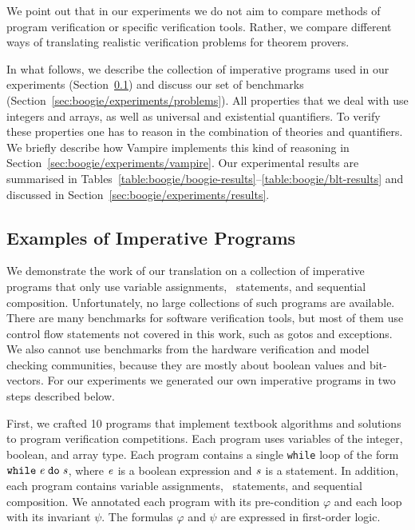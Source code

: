 We point out that in our experiments we do not aim to compare methods of program verification or specific verification tools. Rather, we compare different ways of translating realistic verification problems for theorem provers.

In what follows, we describe the collection of imperative programs used in our experiments (Section~\ref{sec:boogie/experiments/programs}) and discuss our set of benchmarks (Section~\ref{sec:boogie/experiments/problems}). All properties that we deal with use integers and arrays, as well as universal and existential quantifiers. To verify these properties one has to reason in the combination of theories and quantifiers. We briefly describe how Vampire implements this kind of reasoning in Section~\ref{sec:boogie/experiments/vampire}. Our experimental results are summarised in Tables~\ref{table:boogie/boogie-results}--\ref{table:boogie/blt-results} and discussed in Section~\ref{sec:boogie/experiments/results}.

\newcommand{\bad}{\mathit{bad}}
\newcommand{\iter}{i}

\subsection{Examples of Imperative Programs}\label{sec:boogie/experiments/programs}
We demonstrate the work of our translation on a collection of imperative programs that only use variable assignments, \ITE\ statements, and sequential composition. Unfortunately, no large collections of such programs are available. There are many benchmarks for software verification tools, but most of them use control flow statements not covered in this work, such as gotos and exceptions. We also cannot use benchmarks from the hardware verification and model checking communities, because they are mostly about boolean values and bit-vectors. For our experiments we generated our own imperative programs in two steps described below.

First, we crafted 10 programs that implement textbook algorithms and solutions to program verification competitions. Each program uses variables of the integer, boolean, and array type. Each program contains a single \verb'while' loop
of the form $\mathtt{while}\;{\mathit{e}}\;\mathtt{do}\;{\mathit{s}}$, where $\mathit{e}$ is a boolean expression and $\mathit{s}$ is a statement. In addition, each program contains 
variable assignments, \ITE\ statements, and sequential composition. We annotated each program with its pre-condition $\varphi$ and each loop with its invariant $\psi$. The formulas $\varphi$ and $\psi$ are expressed in first-order logic.

